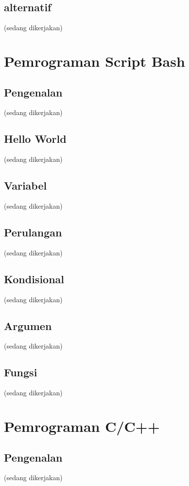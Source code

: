 \documentclass[12pt,]{article}
\begin{document}
	\subsection{alternatif}
	(sedang dikerjakan)
		
	\section{Pemrograman Script Bash}
	
	\subsection{Pengenalan}
	(sedang dikerjakan)
	
	\subsection{Hello World}
	(sedang dikerjakan)
	
	\subsection{Variabel}
	(sedang dikerjakan)
	
	\subsection{Perulangan}
	(sedang dikerjakan)
	
	\subsection{Kondisional}
	(sedang dikerjakan)
	
	\subsection{Argumen}
	(sedang dikerjakan)
	
	\subsection{Fungsi}
	(sedang dikerjakan)
	
	\section{Pemrograman C/C++}
	
	\subsection{Pengenalan}
	(sedang dikerjakan)
	
\end{document}
